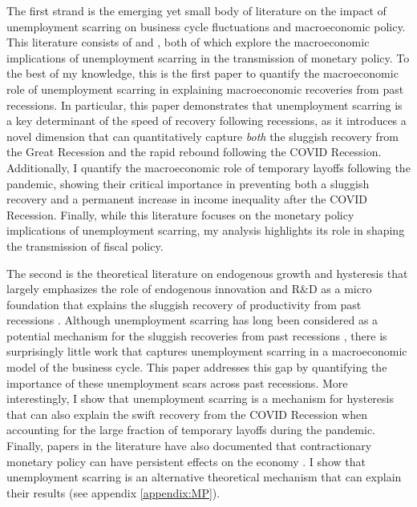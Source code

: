 The first strand is the emerging yet small body of literature on the impact of unemployment scarring on business cycle fluctuations and macroeconomic policy. This literature consists of \cite{AlvesViolante2023} and \cite{AlvesViolante2024}, both of which explore the macroeconomic implications of unemployment scarring in the transmission of monetary policy. To the best of my knowledge, this is the first paper to quantify the macroeconomic role of unemployment scarring in explaining macroeconomic recoveries from past recessions. In particular, this paper demonstrates that unemployment scarring is a key determinant of the speed of recovery following recessions, as it introduces a novel dimension that can quantitatively capture \textit{both} the sluggish recovery from the Great Recession and the rapid rebound following the COVID Recession. Additionally, I quantify the macroeconomic role of temporary layoffs following the pandemic, showing their critical importance in preventing both a sluggish recovery and a permanent increase in income inequality after the COVID Recession. Finally, while this literature focuses on the monetary policy implications of unemployment scarring, my analysis highlights its role in shaping the transmission of fiscal policy.


The second is the theoretical literature on endogenous growth and hysteresis that largely emphasizes the role of endogenous innovation and R$\&$D as a micro foundation that explains the sluggish recovery of productivity from past recessions \citep{Comin2006,Queralto2018,Bianchi2019}.  Although unemployment scarring has long been considered as a potential mechanism for the sluggish recoveries from past recessions \citep{Cerra2023}, there is surprisingly little work that captures unemployment scarring in a macroeconomic model of the business cycle. This paper addresses this gap by quantifying the importance of these unemployment scars across past recessions. More interestingly, I show that unemployment scarring is a mechanism for hysteresis that can also explain the swift recovery from the COVID Recession when accounting for the large fraction of temporary layoffs during the pandemic. Finally, papers in the literature have also documented that contractionary monetary policy can have persistent effects on the economy \citep{Queralto2018, Jorda2023}. I show that unemployment scarring is an alternative theoretical mechanism that can explain their results (see appendix \ref{appendix:MP}). 

